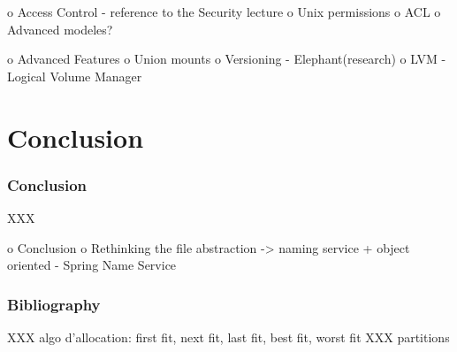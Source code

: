 o Access Control
 - reference to the Security lecture
 o Unix permissions
 o ACL
 o Advanced modeles?

o Advanced Features
 o Union mounts
 o Versioning
   - Elephant(research)
 o LVM - Logical Volume Manager

%
%

\section{Conclusion}


\begin{frame}
  \frametitle{Conclusion}

  XXX
\end{frame}

o Conclusion
 o Rethinking the file abstraction -> naming service + object oriented
   - Spring Name Service

%
%

\begin{frame}
  \frametitle{Bibliography}

  
  
\end{frame}



XXX algo d'allocation: first fit, next fit, last fit, best fit, worst fit
XXX partitions
